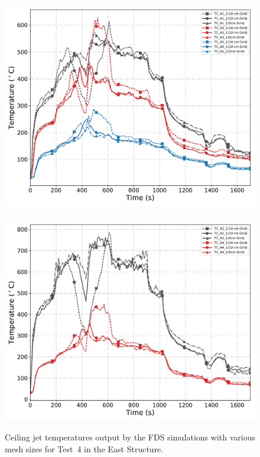 \begin{figure}[!h]
	\centering
	\includegraphics[width=0.87\columnwidth]{Figures/Plots/Grid_Sensitivity/Temperature/Test_04_cjet_1}
	\\~\\
	\includegraphics[width=0.87\columnwidth]{Figures/Plots/Grid_Sensitivity/Temperature/Test_04_cjet_2}
	\caption[Ceiling jet temperatures for East Structure simulations of various mesh sizes.]{Ceiling jet temperatures output by the FDS simulations with various mesh sizes for Test~4 in the East Structure.}
	\label{fig:east_cjet_sensitivity}
\end{figure}

